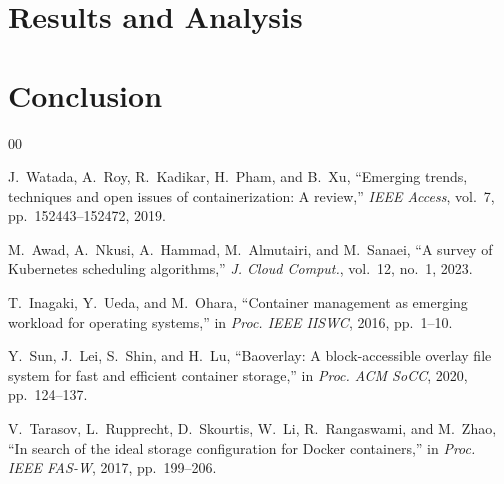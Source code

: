 \documentclass[conference]{IEEEtran}
\begin{document}
\section{Results and Analysis}
\label{sec:results}


\section{Conclusion}
\label{sec:conclusion}



\begin{thebibliography}{00}

J.~Watada, A.~Roy, R.~Kadikar, H.~Pham, and B.~Xu,
``Emerging trends, techniques and open issues of containerization: A review,''
\emph{IEEE Access}, vol.~7, pp.~152443--152472, 2019.

M.~Awad, A.~Nkusi, A.~Hammad, M.~Almutairi, and M.~Sanaei,
``A survey of Kubernetes scheduling algorithms,''
\emph{J. Cloud Comput.}, vol.~12, no.~1, 2023.

T.~Inagaki, Y.~Ueda, and M.~Ohara,
``Container management as emerging workload for operating systems,''
in \emph{Proc. IEEE IISWC}, 2016, pp.~1--10.

Y.~Sun, J.~Lei, S.~Shin, and H.~Lu,
``Baoverlay: A block-accessible overlay file system for fast and efficient container storage,''
in \emph{Proc. ACM SoCC}, 2020, pp.~124--137.

V.~Tarasov, L.~Rupprecht, D.~Skourtis, W.~Li, R.~Rangaswami, and M.~Zhao,
``In search of the ideal storage configuration for Docker containers,''
in \emph{Proc. IEEE FAS-W}, 2017, pp.~199--206.


\end{thebibliography}
\end{document}
